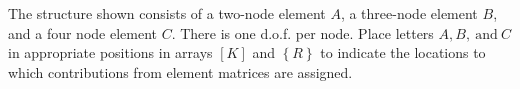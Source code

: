 \documentclass[../main.tex]{subfiles}
\begin{document}

 The structure shown consists of a two-node element $A$, a three-node element $B$, and a four node element $C$.
 There is one d.o.f. per node.
 Place letters $A, B, \ \textrm{and} \ C$ in appropriate positions in arrays $[K]$ and $\left\{R\right\}$ to indicate the locations to which contributions from element matrices are assigned.
\end{document}
